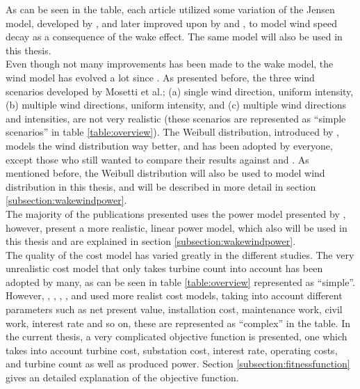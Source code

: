 \noindent As can be seen in the table, each article utilized some variation of the Jensen model, developed by \cite{Jensen}, and later improved upon by \cite{Katic} and \cite{Frandsen}, to model wind speed decay as a consequence of the wake effect. The same model will also be used in this thesis. \\

\noindent Even though not many improvements has been made to the wake model, the wind model has evolved a lot since \cite{Mosetti}. As presented before, the three wind scenarios developed by Mosetti et al.; (a) single wind direction, uniform intensity, (b) multiple wind directions, uniform intensity, and (c) multiple wind directions and intensities, are not very realistic (these scenarios are represented as ``simple scenarios'' in table \ref{table:overview}). The Weibull distribution, introduced by \cite{Mora}, models the wind distribution way better, and has been adopted by everyone, except those who still wanted to compare their results against \cite{Mosetti} and \cite{Grady}. As mentioned before, the Weibull distribution will also be used to model wind distribution in this thesis, and will be described in more detail in section \ref{subsection:wakewindpower}. \\

\noindent The majority of the publications presented uses the power model presented by \cite{Mosetti}, however, \cite{Kusiak} present a more realistic, linear power model, which also will be used in this thesis and are explained in section \ref{subsection:wakewindpower}.\\ 

\noindent The quality of the cost model has varied greatly in the different studies. The very unrealistic cost model that only takes turbine count into account has been adopted by many, as can be seen in table \ref{table:overview} represented as ``simple''. However, \citep{Mora}, \citep{Gonzalez}, \citep{Sisbot}, \citep{Saavedra-Morena}, and \citep{Chen} used more realist cost models, taking into account different parameters such as net present value, installation cost, maintenance work, civil work, interest rate and so on, these are represented as ``complex'' in the table. In the current thesis, a very complicated objective function is presented, one which takes into account turbine cost, substation cost, interest rate, operating costs, and turbine count as well as produced power. Section \ref{subsection:fitnessfunction} gives an detailed explanation of the objective function. \\

